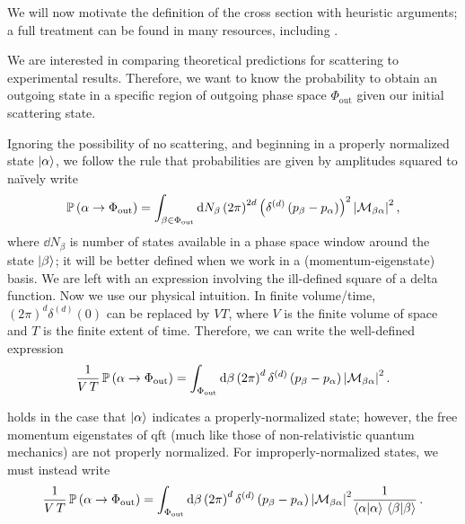 We will now motivate the definition of the cross section with heuristic arguments;
%
a full treatment can be found in many resources, including .

We are interested in comparing theoretical predictions for scattering to experimental results.
%
Therefore, we want to know the probability to obtain an outgoing state in a specific region of outgoing phase space \(\Phi_\text{out}\) given our initial scattering state.

Ignoring the possibility of no scattering, and beginning in a properly normalized state \(\ket{\alpha}\), we follow the rule that probabilities are given by amplitudes squared to na\"ively write
\begin{align}
    \mathbb{P}\left(\alpha \to \Phi_\text{out}\right)
    =
    \int_{\beta \in \Phi_\text{out}}
    \dd N_\beta
    \left(2 \pi\right)^{2d}
    \left(\delta^{(d)}\left(p_\beta - p_\alpha\right)\right)^2
    \abs{\mathcal{M}_{\beta\alpha}}^2
    \,,
\end{align}
where \(\dd N_\beta\) is  number of states available in a phase space window around the state \(\ket{\beta}\);
%
it will be better defined when we work in a (momentum-eigenstate) basis.
%
We are left with an expression involving the ill-defined square of a delta function.
%
Now we use our physical intuition.
%
In finite volume/time, \((2\pi)^d \delta^{(d)}(0)\) can be replaced by \(V T\), where \(V\) is the finite volume of space and \(T\) is the finite extent of time.
%
Therefore, we can write the well-defined expression
\begin{align}
    \label{eq:probability-propertly-normalized}
    \frac{1}{V\,T}
    \,
    \mathbb{P}\le(\alpha \to \Phi_\text{out}\ri)
    =
    \int_{\Phi_\text{out}}
    \dd \beta
    \le(2 \pi\ri)^{d}
    \delta^{(d)}\le(p_\beta - p_\alpha\ri)
    \abs{\mathcal{M}_{\beta\alpha}}^2
    \,.
\end{align}

 holds in the case that \(\ket{\alpha}\) indicates a properly-normalized state;
%
however, the free momentum eigenstates of \gls{qft} (much like those of non-relativistic quantum mechanics) are not properly normalized.
%
For improperly-normalized states, we must instead write
\begin{align}
    \label{eq:probability-not-normalized}
    \frac{1}{V\,T}
    \,
    \mathbb{P}\le(\alpha \to \Phi_\text{out}\ri)
    =
    \int_{\Phi_\text{out}}
    \dd \beta
    \le(2 \pi\ri)^{d}
    \delta^{(d)}\le(p_\beta - p_\alpha\ri)
    \abs{\mathcal{M}_{\beta\alpha}}^2
    \frac{1}{\braket{\alpha}{\alpha}\,\braket{\beta}{\beta}}
    \,.
\end{align}

